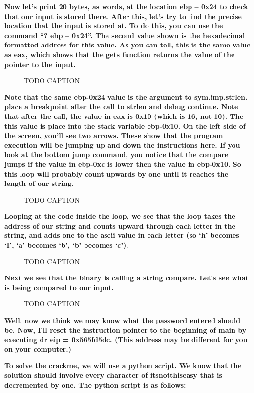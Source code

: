 \documentclass[letterpaper]{article}
\newcommand{\sitfig}[3]{
\begin{figure}[H]
\centering
\makebox[\textwidth][c]{
#2
}
\caption{#3}
\label{#1}
\end{figure}
}
\newcommand{\sitgfx}[4][scale=1.0]{
\sitfig{#3}{\texttt{[image: \#2]}}{#4}
}
\begin{document}
\textbf{Now let's print 20 bytes, as words, at the location ebp -- 0x24 to check that our input is stored there. After
this, let's try to find the precise location that the input is stored at. To do this, you can use the command ``? ebp
-- 0x24''. The second value shown is the hexadecimal formatted address for this value. As you can tell, this is the
same value as eax, which shows that the gets function returns the value of the pointer to the input.}

  
\sitgfx[width=6.5in,height=4.0626in]{FINALWORKINGDOCFORMERLYPRECURSOR-img061.png}{fig:unk}{TODO CAPTION}
 

\textbf{Note that the same ebp-0x24 value is the argument to sym.imp.strlen. place a breakpoint after the call to strlen
and debug continue. Note that after the call, the value in eax is 0x10 (which is 16, not 10). The this value is place
into the stack variable ebp-0x10. On the left side of the screen, you'll see two arrows. These show that the program
execution will be jumping up and down the instructions here. If you look at the bottom jump command, you notice that
the compare jumps if the value in ebp-0xc is lower then the value in ebp-0x10. So this loop will probably count upwards
by one until it reaches the length of our string.}

  
\sitgfx[width=6.5in,height=4.0626in]{FINALWORKINGDOCFORMERLYPRECURSOR-img062.png}{fig:unk}{TODO CAPTION}
 

\textbf{Looping at the code inside the loop, we see that the loop takes the address of our string and counts upward
through each letter in the string, and adds one to the ascii value in each letter (so `h' becomes `I', `a' becomes `b',
`b' becomes `c').}

  
\sitgfx[width=6.5in,height=4.0626in]{FINALWORKINGDOCFORMERLYPRECURSOR-img063.png}{fig:unk}{TODO CAPTION}
 

\textbf{Next we see that the binary is calling a string compare. Let's see what is being compared to our input.}

  
\sitgfx[width=6.5in,height=4.0626in]{FINALWORKINGDOCFORMERLYPRECURSOR-img064.png}{fig:unk}{TODO CAPTION}
 

\textbf{Well, now we think we may know what the password entered should be. Now, I'll reset the instruction pointer to
the beginning of main by executing dr eip = 0x565fd5dc. (This address may be different for you on your computer.)}

\textbf{To solve the crackme, we will use a python script. We know that the solution should involve every character of
itsnotthiseasy that is decremented by one. The python script is as follows:}
\end{document}
